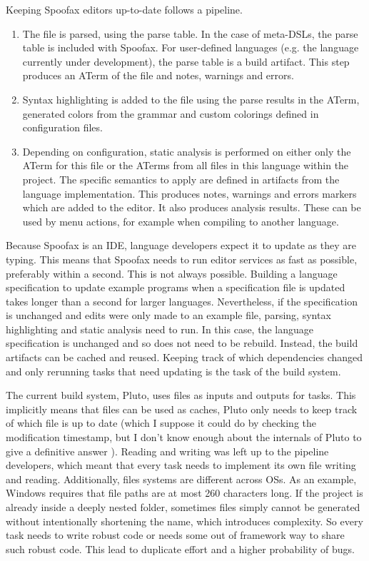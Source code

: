 Keeping Spoofax editors up-to-date follows a pipeline.
\begin{enumerate}
  \item The file is parsed, using the parse table.
  In the case of meta-\acp{DSL}, the parse table is included with Spoofax.
  For user-defined languages (e.g. the language currently under development), the parse table is a build artifact.
  This step produces an ATerm of the file and notes, warnings and errors.
  \item Syntax highlighting is added to the file using the parse results in the ATerm, generated colors from the grammar and custom colorings defined in configuration files.
  \item Depending on configuration, static analysis is performed on either only the ATerm for this file or the ATerms from all files in this language within the project.
  The specific semantics to apply are defined in artifacts from the language implementation.
  This produces notes, warnings and errors markers which are added to the editor.
  It also produces analysis results.
  These can be used by menu actions, for example when compiling to another language.
\end{enumerate}

Because Spoofax is an IDE, language developers expect it to update as they are typing.
This means that Spoofax needs to run editor services as fast as possible, preferably within a second.
This is not always possible.
Building a language specification to update example programs when a specification file is updated takes longer than a second for larger languages.
Nevertheless, if the specification is unchanged and edits were only made to an example file, parsing, syntax highlighting and static analysis need to run.
In this case, the language specification is unchanged and so does not need to be rebuild.
Instead, the build artifacts can be cached and reused.
Keeping track of which dependencies changed and only rerunning tasks that need updating is the task of the build system.

The current build system, Pluto, uses files as inputs and outputs for tasks.
This implicitly means that files can be used as caches, Pluto only needs to keep track of which file is up to date (which I suppose it could do by checking the modification timestamp, but I don't know enough about the internals of Pluto to give a definitive answer ).
Reading and writing was left up to the pipeline developers, which meant that every task needs to implement its own file writing and reading.
Additionally, files systems are different across \acp{OS}.
As an example, Windows requires that file paths are at most 260 characters long.
If the project is already inside a deeply nested folder, sometimes files simply cannot be generated without intentionally shortening the name, which introduces complexity.
So every task needs to write robust code or needs some out of framework way to share such robust code.
This lead to duplicate effort and a higher probability of bugs.


